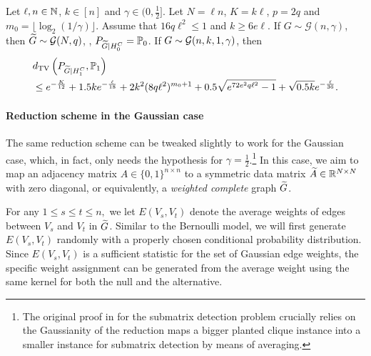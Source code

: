 \begin{proposition}\label{prop:reduction}
Let $\ell, n \in {\mathbb{N}}$, $k \in [n]$ and $\gamma \in (0,\frac{1}{2} ]$. Let $N= \ell n$, $K=k\ell$, $p=2q$ and $m_0= \lfloor \log_2 (1/\gamma) \rfloor$. Assume that $16 q \ell^2 \le  1$ and $k \geq 6e \ell$.
If $G \sim \mathcal{G}(n, \gamma)$, then ${\widetilde{G}} \sim {\mathcal{G}}(N,q)$, \ie, $P_{{\widetilde{G}}|H_0^C}=\mathbb{P}_0$.
If $G \sim {\mathcal{G}}(n,k,1,\gamma)$, then
\begin{align}
& d_{\rm TV} \left(P_{{\widetilde{G}}|H_1^C}, \mathbb{P}_1 \right)  \nonumber \\
& \le e^{-\frac{K}{12}} + 1.5 k e^{-\frac{\ell}{18}} + 2 k^2 (8q\ell^2)^{m_0+1} + 0.5 \sqrt{e^{72e^2 q \ell^2} -1} + \sqrt{0.5k} e^{-\frac{\ell}{36}}. \label{eq:defxi}
\end{align}
\end{proposition}




\paragraph{Reduction scheme in the Gaussian case}
The same reduction scheme can be tweaked slightly to work for the Gaussian case, which, in fact, only needs the \PC hypothesis for $\gamma = \frac{1}{2}$.\footnote{The original proof in \cite{ma2013submatrix} for the submatrix detection problem crucially relies on the Gaussianity of the reduction maps a bigger planted clique instance into a smaller instance for submatrix detection by means of averaging.}
In this case, we aim to map an adjacency matrix $A \in \{0,1\}^{n \times n}$ 
to a symmetric data matrix ${\widetilde{A}} \in {\mathbb{R}}^{N \times N}$ with zero diagonal, or equivalently, a 
\emph{weighted complete} graph ${\widetilde{G}}$. 


For any $1 \leq s \leq t \leq n,$ we let $E(V_s, V_t)$
denote the average weights of edges between $V_s$ and $V_t$ in ${\widetilde{G}}$. 
Similar to the Bernoulli model, we will first generate 
$E(V_s, V_t)$ randomly with a properly chosen conditional probability distribution. 
Since $E(V_s,V_t)$ is a sufficient statistic for the set of Gaussian edge weights, the specific weight assignment 
can be generated from the average weight using the same kernel for both the null and the alternative. 

